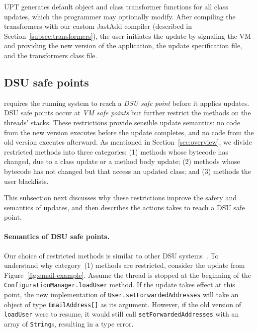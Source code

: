 \noindent  \ac{UPT} generates default object and class transformer
functions for all class updates, which the programmer may optionally
modify.  After compiling the transformers with our custom JastAdd compiler
(described in Section~\ref{subsec:transformers}), the user initiates the update by signaling the
\DSU{} VM and providing the new version of the application, the 
update specification file, and the transformers class file.


\subsection{DSU safe points}
\label{sec:safe}

\DSU{} requires the running system to reach a \emph{DSU safe point}
before it applies updates.  DSU safe points occur at \emph{VM safe
  points} but further restrict the methods on the threads' stacks.
These restrictions provide sensible update semantics: no
code from the new version executes before the update completes, and no
code from the old version executes afterward.  As mentioned in
Section~\ref{sec:overview}, we divide restricted methods into three
categories: (1) methods whose bytecode has changed, due to a class
update or a method body update; (2) methods whose bytecode has not
changed but that access an updated class; and (3) methods the user
blacklists.

This subsection next discusses why these restrictions improve the safety
and semantics of updates, and then describes the actions \DSU{}
takes to reach a DSU safe point.


\paragraph{Semantics of DSU safe points.}

Our choice of restricted methods is similar to other DSU
systems~\cite{ritzau00dynamic,Mala00a,altekar05opus,eaddy05enc,JVMhotswap,VSEnC,chen:icse07,K42reconfig}.
To understand why category~(1) methods are restricted,
consider the update from Figure~\ref{fig:email-example}.  Assume the
thread is stopped at the beginning of the
{\tt ConfigurationManager.loadUser} method. If the update takes
effect at this point, the new implementation of
{\tt User.setForward\-ed\-Ad\-dresses} will take an object of type
{\tt EmailAddress[]} as its argument.  However, if the old version
of {\tt loadUser} were to resume, it would still call
{\tt set\-Forwarded\-Addresses} with an array of {\tt String}s,
resulting in a type error.

